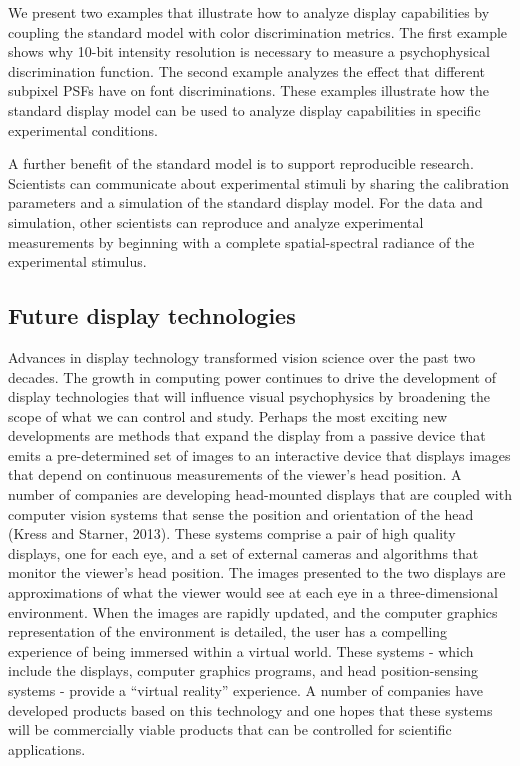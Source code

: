 \documentclass[
  letterpaper,
]{book}
\begin{document}
We present two examples that illustrate how to analyze display
capabilities by coupling the standard model with color discrimination
metrics. The first example shows why 10-bit intensity resolution is
necessary to measure a psychophysical discrimination function. The
second example analyzes the effect that different subpixel PSFs have on
font discriminations. These examples illustrate how the standard display
model can be used to analyze display capabilities in specific
experimental conditions.

A further benefit of the standard model is to support reproducible
research. Scientists can communicate about experimental stimuli by
sharing the calibration parameters and a simulation of the standard
display model. For the data and simulation, other scientists can
reproduce and analyze experimental measurements by beginning with a
complete spatial-spectral radiance of the experimental stimulus.

\subsection{Future display
technologies}\label{future-display-technologies}

Advances in display technology transformed vision science over the past
two decades. The growth in computing power continues to drive the
development of display technologies that will influence visual
psychophysics by broadening the scope of what we can control and study.
Perhaps the most exciting new developments are methods that expand the
display from a passive device that emits a pre-determined set of images
to an interactive device that displays images that depend on continuous
measurements of the viewer's head position. A number of companies are
developing head-mounted displays that are coupled with computer vision
systems that sense the position and orientation of the head (Kress and
Starner, 2013). These systems comprise a pair of high quality displays,
one for each eye, and a set of external cameras and algorithms that
monitor the viewer's head position. The images presented to the two
displays are approximations of what the viewer would see at each eye in
a three-dimensional environment. When the images are rapidly updated,
and the computer graphics representation of the environment is detailed,
the user has a compelling experience of being immersed within a virtual
world. These systems - which include the displays, computer graphics
programs, and head position-sensing systems - provide a ``virtual
reality'' experience. A number of companies have developed products
based on this technology and one hopes that these systems will be
commercially viable products that can be controlled for scientific
applications.
\end{document}
